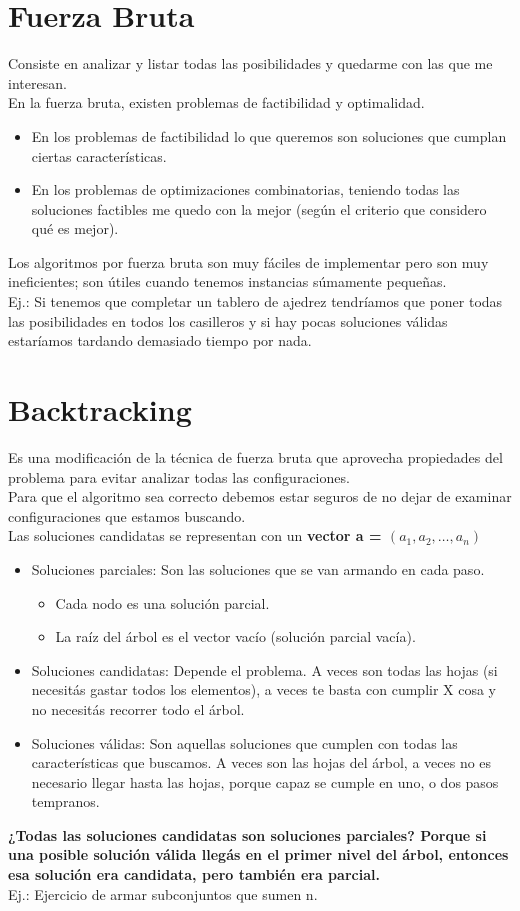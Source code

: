 \documentclass[10pt,a4paper]{article}
\begin{document}
\section*{Fuerza Bruta}
Consiste en analizar y listar todas las posibilidades y quedarme con las que me interesan. \\
En la fuerza bruta, existen problemas de factibilidad y optimalidad. 
\begin{itemize}
    \item En los problemas de factibilidad lo que queremos son soluciones que cumplan ciertas características. 
    \item En los problemas de optimizaciones combinatorias, teniendo todas las soluciones factibles me quedo con la mejor (según el criterio que considero qué es mejor). 
\end{itemize}
Los algoritmos por fuerza bruta son muy fáciles de implementar pero son muy ineficientes; son útiles cuando tenemos instancias súmamente pequeñas. \\

Ej.: Si tenemos que completar un tablero de ajedrez tendríamos que poner todas las posibilidades en todos los casilleros y si hay pocas soluciones válidas estaríamos tardando demasiado tiempo por nada.
\section*{Backtracking}
Es una modificación de la técnica de fuerza bruta que aprovecha propiedades del problema para evitar analizar todas las configuraciones. \\
Para que el algoritmo sea correcto debemos estar seguros de no dejar de examinar configuraciones que estamos buscando. \\
Las soluciones candidatas se representan con un \textbf{vector a = $(a_{1}, a_{2}, \dots, a_{n})$}
\begin{itemize}
    \item Soluciones parciales: Son las soluciones que se van armando en cada paso. 
    \begin{itemize}
        \item Cada nodo es una solución parcial.
        \item La raíz del árbol es el vector vacío (solución parcial vacía).
    \end{itemize}
    \item Soluciones candidatas: Depende el problema. A veces son todas las hojas (si necesitás gastar todos los elementos), a veces te basta con cumplir X cosa y no necesitás recorrer todo el árbol. 
    \item Soluciones válidas: Son aquellas soluciones que cumplen con todas las características que buscamos. A veces son las hojas del árbol, a veces no es necesario llegar hasta las hojas, porque capaz se cumple en uno, o dos pasos tempranos.
\end{itemize}
\textbf{¿Todas las soluciones candidatas son soluciones parciales? Porque si una posible solución válida llegás en el primer nivel del árbol, entonces esa solución era candidata, pero también era parcial.} \\
Ej.: Ejercicio de armar subconjuntos que sumen n.  
\end{document}
